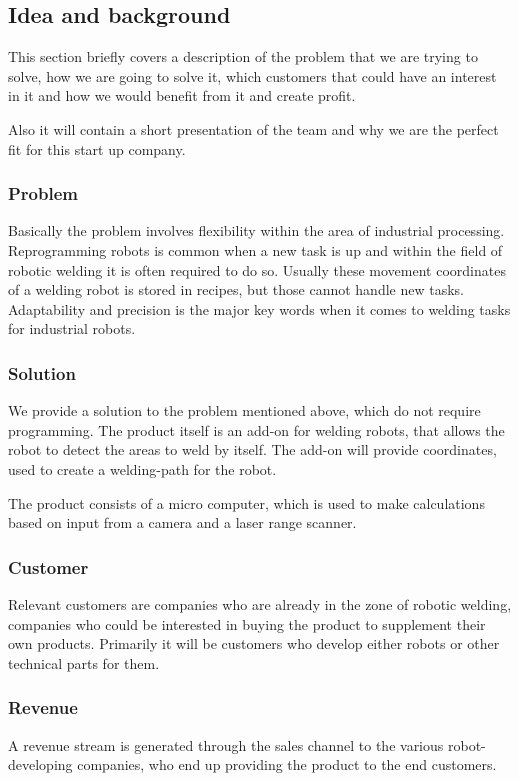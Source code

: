 \subsection{Idea and background}
This section briefly covers a description of the problem that we are trying to solve, how we are going to solve it, which customers that could have an interest in it and how we would benefit from it and create profit.

Also it will contain a short presentation of the team and why we are the perfect fit for this start up company.

\subsubsection{Problem}
Basically the problem involves flexibility within the area of industrial processing. Reprogramming robots is common when a new task is up and within the field of robotic welding it is often required to do so. Usually these movement coordinates of a welding robot is stored in recipes, but those cannot handle new tasks. Adaptability and precision is the major key words when it comes to welding tasks for industrial robots.

\subsubsection{Solution}
We provide a solution to the problem mentioned above, which do not require programming. The product itself is an add-on for welding robots, that allows the robot to detect the areas to weld by itself. The add-on will provide coordinates, used to create a welding-path for the robot. 

The product consists of a micro computer, which is used to make  calculations based on input from a camera and a laser range scanner. 

\subsubsection{Customer}
Relevant customers are companies who are already in the zone of robotic welding, companies who could be interested in buying the product to supplement their own products. Primarily it will be customers who develop either robots or other technical parts for them.  

\subsubsection{Revenue}
A revenue stream is generated through the sales channel to the various robot-developing companies, who end up providing the product to the end customers.   

